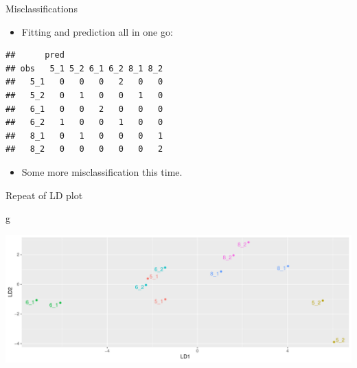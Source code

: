 \documentclass[
  ignorenonframetext,
]{beamer}
\newenvironment{Shaded}{\begin{snugshade}}{\end{snugshade}}
\newcommand{\DataTypeTok}[1]{\textcolor[rgb]{0.13,0.29,0.53}{#1}}
\newcommand{\KeywordTok}[1]{\textcolor[rgb]{0.13,0.29,0.53}{\textbf{#1}}}
\newcommand{\NormalTok}[1]{#1}
\newcommand{\OperatorTok}[1]{\textcolor[rgb]{0.81,0.36,0.00}{\textbf{#1}}}
\newcommand{\StringTok}[1]{\textcolor[rgb]{0.31,0.60,0.02}{#1}}
\providecommand{\tightlist}{%
  \setlength{\itemsep}{0pt}\setlength{\parskip}{0pt}}
\begin{document}
\begin{frame}[fragile]{Misclassifications}
\protect\hypertarget{misclassifications}{}

\begin{itemize}
\tightlist
\item
  Fitting and prediction all in one go:
\end{itemize}

\small

\begin{Shaded}
\end{Shaded}

\begin{verbatim}
##      pred
## obs   5_1 5_2 6_1 6_2 8_1 8_2
##   5_1   0   0   0   2   0   0
##   5_2   0   1   0   0   1   0
##   6_1   0   0   2   0   0   0
##   6_2   1   0   0   1   0   0
##   8_1   0   1   0   0   0   1
##   8_2   0   0   0   0   0   2
\end{verbatim}

\normalsize

\begin{itemize}
\tightlist
\item
  Some more misclassification this time.
\end{itemize}

\end{frame}

\begin{frame}[fragile]{Repeat of LD plot}
\protect\hypertarget{repeat-of-ld-plot}{}

\begin{Shaded}
\begin{Highlighting}[]
\NormalTok{g}
\end{Highlighting}
\end{Shaded}

\includegraphics{slides_d29_files/figure-beamer/graziani-1.pdf}

\end{frame}
\end{document}
